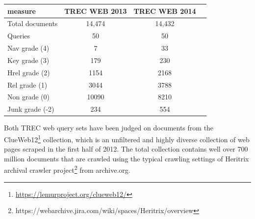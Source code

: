 \begin{center}
  \begin{tabular}{ l | c | c | c }
    measure & TREC WEB 2013 & TREC WEB 2014 \\
    \hline
    Total documents & 14,474 & 14,432 \\
    Queries & 50 & 50 \\
    Nav grade (4) & 7 & 33 \\
    Key grade (3) & 179 & 230 \\
    Hrel grade (2) & 1154 & 2168 \\
    Rel grade (1) & 3044 & 3788 \\
    Non grade (0) & 10090 & 8210 \\
    Junk grade (-2) & 234 & 554 \\
    \hline
  \end{tabular}
   \label{tab:webstats} 
\end{center}

Both TREC web query sets have been judged on documents from the  ClueWeb12\footnote{\url{https://lemurproject.org/clueweb12/}} collection, which is an unfiltered and highly diverse collection of web pages scraped in the first half of 2012. The total collection contains well over 700 million documents that are crawled using the typical crawling settings of Heritrix archival crawler project\footnote{https://webarchive.jira.com/wiki/spaces/Heritrix/overview} from archive.org.  


